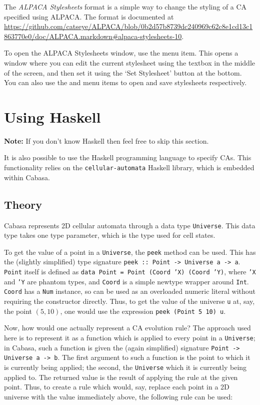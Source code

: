 \documentclass[oneside,a4paper]{memoir}
\begin{document}
The \emph{ALPACA Stylesheets} format is a simple way to change the styling of a CA specified using ALPACA.
The format is documented at \url{https://github.com/catseye/ALPACA/blob/0b2d57b8739dc240969c62c8e1cd13c1863770e0/doc/ALPACA.markdown#alpaca-stylesheets-10}.

To open the ALPACA Stylesheets window, use the  menu item.
This opens a window where you can edit the current stylesheet using the textbox in the middle of the screen,
  and then set it using the `Set Stylesheet' button at the bottom.
You can also use the  and  menu items to open and save stylesheets respectively.

\section{Using Haskell}
\label{sec:ushs}

\textbf{Note:} If you don't know Haskell then feel free to skip this section.

\vspace{2ex}

\noindent It is also possible to use the Haskell programming language to specify CAs.
This functionality relies on the \texttt{cellular-automata} Haskell library, which is embedded within Cabasa.

\subsection{Theory}
\label{sec:hsth}

Cabasa represents 2D cellular automata through a data type \texttt{Universe}.
This data type takes one type parameter, which is the type used for cell states.

To get the value of a point in a \texttt{Universe}, the \texttt{peek} method can be used.
This has the (slightly simplified) type signature \texttt{peek :: Point -> Universe a -> a}.
\texttt{Point} itself is defined as \texttt{data Point = Point (Coord 'X) (Coord 'Y)},
  where \texttt{'X} and \texttt{'Y} are phantom types,
  and \texttt{Coord} is a simple newtype wrapper around \texttt{Int}.
\texttt{Coord} has a \texttt{Num} instance,
  so can be used as an overloaded numeric literal without requiring the constructor directly.
Thus, to get the value of the universe \texttt{u} at, say, the point $(5, 10)$,
  one would use the expression \texttt{peek (Point 5 10) u}.

Now, how would one actually represent a CA evolution rule?
The approach used here is to represent it as a function which is applied to every point in a \texttt{Universe};
  in Cabasa, such a function is given the (again simplified) signature \texttt{Point -> Universe~a -> b}.
The first argument to such a function is the point to which it is currently being applied;
  the second, the \texttt{Universe} which it is currently being applied to.
The returned value is the result of applying the rule at the given point.
Thus, to create a rule which would, say, replace each point in a 2D universe with the value immediately above,
  the following rule can be used:
\end{document}
